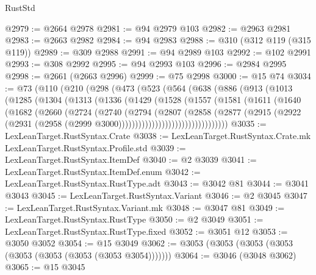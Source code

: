 \begin{lexlean}{RustStd}
\begin{coremodule}
@2979 := @2664 @2978
@2981 := @94 @2979 @103
@2982 := @2963 @2981
@2983 := @2663 @2982
@2984 := @94 @2983
@2988 := @310 (@312 @119 (@315 @119))
@2989 := @309 @2988
@2991 := @94 @2989 @103
@2992 := @102 @2991
@2993 := @308 @2992
@2995 := @94 @2993 @103
@2996 := @2984 @2995
@2998 := @2661 (@2663 @2996)
@2999 := @75 @2998
@3000 := @15 @74
@3034 := @73
    (@110
      (@210
        (@298
          (@473
            (@523
              (@564
                (@638
                  (@886
                    (@913
                      (@1013
                        (@1285
                          (@1304
                            (@1313
                              (@1336
                                (@1429
                                  (@1528
                                    (@1557
                                      (@1581
                                        (@1611
                                          (@1640
                                            (@1682
                                              (@2660
                                                (@2724
                                                  (@2740
                                                    (@2794
                                                      (@2807
                                                        (@2858
                                                          (@2877
                                                            (@2915
                                                              (@2922
                                                                (@2931
                                                                  (@2958
                                                                    (@2999
                                                                      @3000)))))))))))))))))))))))))))))))))
@3035 := LexLeanTarget.RustSyntax.Crate
@3038 := LexLeanTarget.RustSyntax.Crate.mk LexLeanTarget.RustSyntax.Profile.std
@3039 := LexLeanTarget.RustSyntax.ItemDef
@3040 := @2 @3039
@3041 := LexLeanTarget.RustSyntax.ItemDef.enum
@3042 := LexLeanTarget.RustSyntax.RustType.adt
@3043 := @3042 @81
@3044 := @3041 @3043
@3045 := LexLeanTarget.RustSyntax.Variant
@3046 := @2 @3045
@3047 := LexLeanTarget.RustSyntax.Variant.mk
@3048 := @3047 @81
@3049 := LexLeanTarget.RustSyntax.RustType
@3050 := @2 @3049
@3051 := LexLeanTarget.RustSyntax.RustType.fixed
@3052 := @3051 @12
@3053 := @3050 @3052
@3054 := @15 @3049
@3062 := @3053 (@3053 (@3053 (@3053 (@3053 (@3053 (@3053 (@3053 @3054)))))))
@3064 := @3046 (@3048 @3062)
@3065 := @15 @3045

\end{coremodule}
\end{lexlean}
